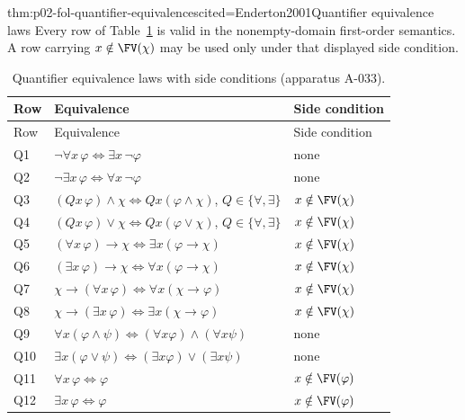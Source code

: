 \begin{hbtheorem}{thm:p02-fol-quantifier-equivalences}{cited=Enderton2001}{Quantifier equivalence laws}
Every row of Table~\ref{tab:p02-quantifier-equivalences} is valid in the
nonempty-domain first-order semantics.  A row carrying
\(x\notin\FV(\chi)\) may be used only under that displayed side condition.
\end{hbtheorem}

\begingroup\small\setlength{\tabcolsep}{4pt}
\begin{longtable}{@{}p{.32in}p{2.55in}p{1.88in}@{}}
\caption{Quantifier equivalence laws with side conditions (apparatus A-033).}
\label{tab:p02-quantifier-equivalences}\\
\toprule
Row & Equivalence & Side condition \\ \midrule
\endfirsthead
\toprule Row & Equivalence & Side condition \\ \midrule
\endhead
Q1 & \(\neg\forall x\,\varphi\Leftrightarrow
       \exists x\,\neg\varphi\) & none \\
Q2 & \(\neg\exists x\,\varphi\Leftrightarrow
       \forall x\,\neg\varphi\) & none \\
Q3 & \((Qx\,\varphi)\land\chi\Leftrightarrow
       Qx(\varphi\land\chi)\), \(Q\in\{\forall,\exists\}\) &
       \(x\notin\FV(\chi)\) \\
Q4 & \((Qx\,\varphi)\lor\chi\Leftrightarrow
       Qx(\varphi\lor\chi)\), \(Q\in\{\forall,\exists\}\) &
       \(x\notin\FV(\chi)\) \\
Q5 & \((\forall x\,\varphi)\to\chi\Leftrightarrow
       \exists x(\varphi\to\chi)\) & \(x\notin\FV(\chi)\) \\
Q6 & \((\exists x\,\varphi)\to\chi\Leftrightarrow
       \forall x(\varphi\to\chi)\) & \(x\notin\FV(\chi)\) \\
Q7 & \(\chi\to(\forall x\,\varphi)\Leftrightarrow
       \forall x(\chi\to\varphi)\) & \(x\notin\FV(\chi)\) \\
Q8 & \(\chi\to(\exists x\,\varphi)\Leftrightarrow
       \exists x(\chi\to\varphi)\) & \(x\notin\FV(\chi)\) \\
Q9 & \(\forall x(\varphi\land\psi)\Leftrightarrow
       (\forall x\varphi)\land(\forall x\psi)\) & none \\
Q10 & \(\exists x(\varphi\lor\psi)\Leftrightarrow
         (\exists x\varphi)\lor(\exists x\psi)\) & none \\
Q11 & \(\forall x\,\varphi\Leftrightarrow\varphi\) &
        \(x\notin\FV(\varphi)\) \\
Q12 & \(\exists x\,\varphi\Leftrightarrow\varphi\) &
        \(x\notin\FV(\varphi)\) \\
\bottomrule
\end{longtable}
\endgroup

